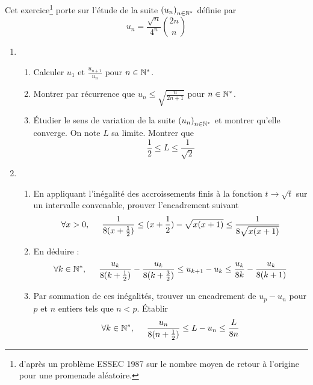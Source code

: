 Cet exercice\footnote{d'après un problème ESSEC 1987 sur le nombre moyen de retour à l'origine pour une promenade aléatoire.} porte sur l'étude de la suite $\left( u_n\right) _{n\in \mathbb{N}^*}$ définie par
\begin{displaymath}
 u_n = \frac{\sqrt{n}}{4^n}\binom{2n}{n}
\end{displaymath}
\begin{enumerate}
 \item
\begin{enumerate}
 \item Calculer $u_1$ et $\frac{u_{n+1}}{u_n}$ pour $n\in \mathbb{N}^*$.
 \item Montrer par récurrence que $u_n\leq \sqrt{\frac{n}{2n+1}}$  pour $n\in \mathbb{N}^*$.
 \item \'Etudier le sens de variation de la suite  $\left( u_n\right) _{n\in \mathbb{N}^*}$ et montrer qu'elle converge. On note $L$ sa limite. Montrer que
\begin{displaymath}
 \frac{1}{2} \leq L \leq \frac{1}{\sqrt{2}}
\end{displaymath}
\end{enumerate}

 \item
\begin{enumerate}
 \item En appliquant l'inégalité des accroissements finis à la fonction $t\rightarrow\sqrt{t}$ sur un intervalle convenable, prouver l'encadrement suivant
\begin{displaymath}
 \forall x>0,\hspace{0.5cm}
\frac{1}{8(x+\frac{1}{2})} \leq
(x+\frac{1}{2})-\sqrt{x(x+1)}\leq \frac{1}{8\sqrt{x(x+1)}}
\end{displaymath}

 \item En déduire :
\begin{displaymath}
 \forall k\in \mathbb{N}^*, \hspace{0.5cm}
\frac{u_k}{8(k+\frac{1}{2})} - \frac{u_k}{8(k+\frac{3}{2})}
\leq u_{k+1} - u_k \leq
\frac{u_k}{8k} - \frac{u_k}{8(k+1)}
\end{displaymath}

 \item Par sommation de ces inégalités, trouver un encadrement de $u_p - u_n$ pour $p$ et $n$ entiers tels que $n<p$. \'Etablir
\begin{displaymath}
 \forall k\in \mathbb{N}^*, \hspace{0.5cm}
 \frac{u_n}{8(n+\frac{1}{2})} \leq L - u_n \leq \frac{L}{8n}
\end{displaymath}


\end{enumerate}
\end{enumerate}
